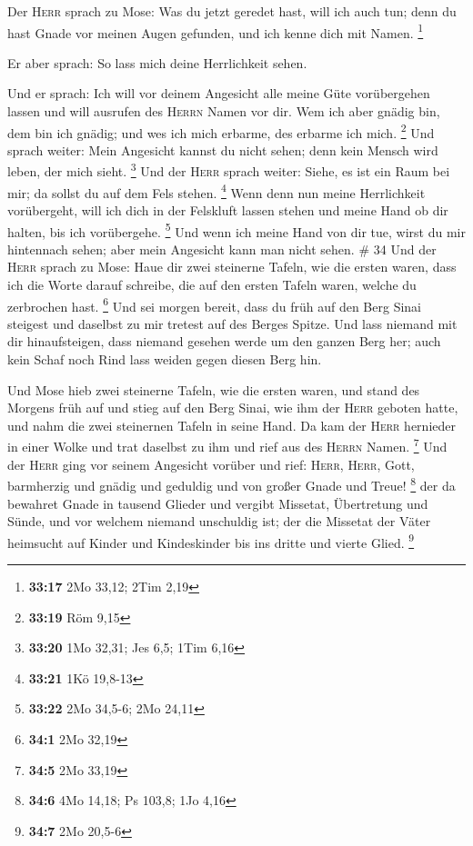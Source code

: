  Der \textsc{Herr} sprach zu Mose: Was du jetzt geredet
hast, will ich auch tun; denn du hast Gnade vor meinen Augen gefunden,
und ich kenne dich mit Namen. \footnote{\textbf{33:17} 2Mo 33,12; 2Tim
  2,19}

 Er aber sprach: So lass mich deine Herrlichkeit sehen.

 Und er sprach: Ich will vor deinem Angesicht alle meine
Güte vorübergehen lassen und will ausrufen des \textsc{Herrn} Namen vor
dir. Wem ich aber gnädig bin, dem bin ich gnädig; und wes ich mich
erbarme, des erbarme ich mich. \footnote{\textbf{33:19} Röm 9,15}
 Und sprach weiter: Mein Angesicht kannst du nicht sehen;
denn kein Mensch wird leben, der mich sieht. \footnote{\textbf{33:20}
  1Mo 32,31; Jes 6,5; 1Tim 6,16}  Und der \textsc{Herr}
sprach weiter: Siehe, es ist ein Raum bei mir; da sollst du auf dem Fels
stehen. \footnote{\textbf{33:21} 1Kö 19,8-13}  Wenn denn
nun meine Herrlichkeit vorübergeht, will ich dich in der Felskluft
lassen stehen und meine Hand ob dir halten, bis ich vorübergehe.
\footnote{\textbf{33:22} 2Mo 34,5-6; 2Mo 24,11}  Und wenn
ich meine Hand von dir tue, wirst du mir hintennach sehen; aber mein
Angesicht kann man nicht sehen. \# 34  Und der
\textsc{Herr} sprach zu Mose: Haue dir zwei steinerne Tafeln, wie die
ersten waren, dass ich die Worte darauf schreibe, die auf den ersten
Tafeln waren, welche du zerbrochen hast. \footnote{\textbf{34:1} 2Mo
  32,19}  Und sei morgen bereit, dass du früh auf den Berg
Sinai steigest und daselbst zu mir tretest auf des Berges Spitze.
 Und lass niemand mit dir hinaufsteigen, dass niemand
gesehen werde um den ganzen Berg her; auch kein Schaf noch Rind lass
weiden gegen diesen Berg hin.

 Und Mose hieb zwei steinerne Tafeln, wie die ersten
waren, und stand des Morgens früh auf und stieg auf den Berg Sinai, wie
ihm der \textsc{Herr} geboten hatte, und nahm die zwei steinernen Tafeln
in seine Hand.  Da kam der \textsc{Herr} hernieder in
einer Wolke und trat daselbst zu ihm und rief aus des \textsc{Herrn}
Namen. \footnote{\textbf{34:5} 2Mo 33,19}  Und der
\textsc{Herr} ging vor seinem Angesicht vorüber und rief: \textsc{Herr},
\textsc{Herr}, Gott, barmherzig und gnädig und geduldig und von großer
Gnade und Treue! \footnote{\textbf{34:6} 4Mo 14,18; Ps 103,8; 1Jo 4,16}
 der da bewahret Gnade in tausend Glieder und vergibt
Missetat, Übertretung und Sünde, und vor welchem niemand unschuldig ist;
der die Missetat der Väter heimsucht auf Kinder und Kindeskinder bis ins
dritte und vierte Glied. \footnote{\textbf{34:7} 2Mo 20,5-6}

